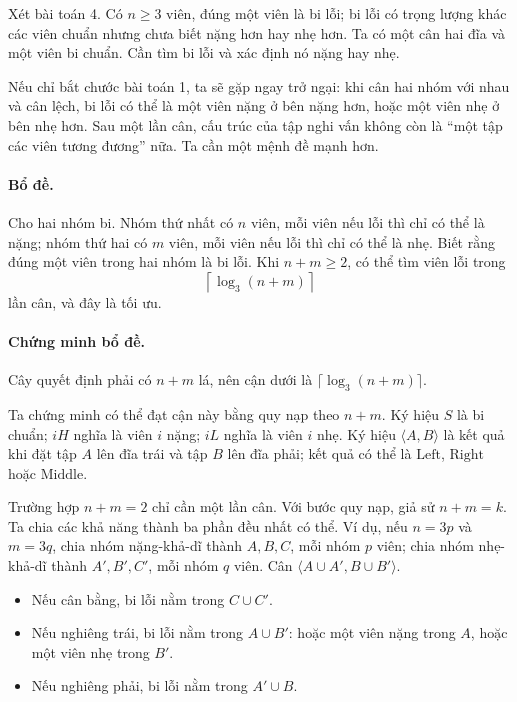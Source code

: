 \documentclass[11pt]{article}
\begin{document}
Xét bài toán 4. Có \(n\ge 3\) viên, đúng một viên là bi lỗi; bi lỗi có trọng
lượng khác các viên chuẩn nhưng chưa biết nặng hơn hay nhẹ hơn. Ta có một cân
hai đĩa và một viên bi chuẩn. Cần tìm bi lỗi và xác định nó nặng hay nhẹ.

Nếu chỉ bắt chước bài toán 1, ta sẽ gặp ngay trở ngại: khi cân hai nhóm với
nhau và cân lệch, bi lỗi có thể là một viên nặng ở bên nặng hơn, hoặc một
viên nhẹ ở bên nhẹ hơn. Sau một lần cân, cấu trúc của tập nghi vấn không còn
là ``một tập các viên tương đương'' nữa. Ta cần một mệnh đề mạnh hơn.

\paragraph{Bổ đề.}
Cho hai nhóm bi. Nhóm thứ nhất có \(n\) viên, mỗi viên nếu lỗi thì chỉ có thể
là nặng; nhóm thứ hai có \(m\) viên, mỗi viên nếu lỗi thì chỉ có thể là nhẹ.
Biết rằng đúng một viên trong hai nhóm là bi lỗi. Khi \(n+m\ge 2\), có thể
tìm viên lỗi trong
\[
  \left\lceil \log_3(n+m) \right\rceil
\]
lần cân, và đây là tối ưu.

\paragraph{Chứng minh bổ đề.}
Cây quyết định phải có \(n+m\) lá, nên cận dưới là
\(\lceil\log_3(n+m)\rceil\).

Ta chứng minh có thể đạt cận này bằng quy nạp theo \(n+m\). Ký hiệu \(S\) là
bi chuẩn; \(iH\) nghĩa là viên \(i\) nặng; \(iL\) nghĩa là viên \(i\) nhẹ.
Ký hiệu \(\langle A,B\rangle\) là kết quả khi đặt tập \(A\) lên đĩa trái và
tập \(B\) lên đĩa phải; kết quả có thể là \(\mathrm{Left}\),
\(\mathrm{Right}\) hoặc \(\mathrm{Middle}\).

Trường hợp \(n+m=2\) chỉ cần một lần cân. Với bước quy nạp, giả sử
\(n+m=k\). Ta chia các khả năng thành ba phần đều nhất có thể. Ví dụ, nếu
\(n=3p\) và \(m=3q\), chia nhóm nặng-khả-dĩ thành \(A,B,C\), mỗi nhóm \(p\)
viên; chia nhóm nhẹ-khả-dĩ thành \(A',B',C'\), mỗi nhóm \(q\) viên. Cân
\(\langle A\cup A', B\cup B'\rangle\).

\begin{itemize}
  \item Nếu cân bằng, bi lỗi nằm trong \(C\cup C'\).
  \item Nếu nghiêng trái, bi lỗi nằm trong \(A\cup B'\): hoặc một viên nặng
  trong \(A\), hoặc một viên nhẹ trong \(B'\).
  \item Nếu nghiêng phải, bi lỗi nằm trong \(A'\cup B\).
\end{itemize}
\end{document}
